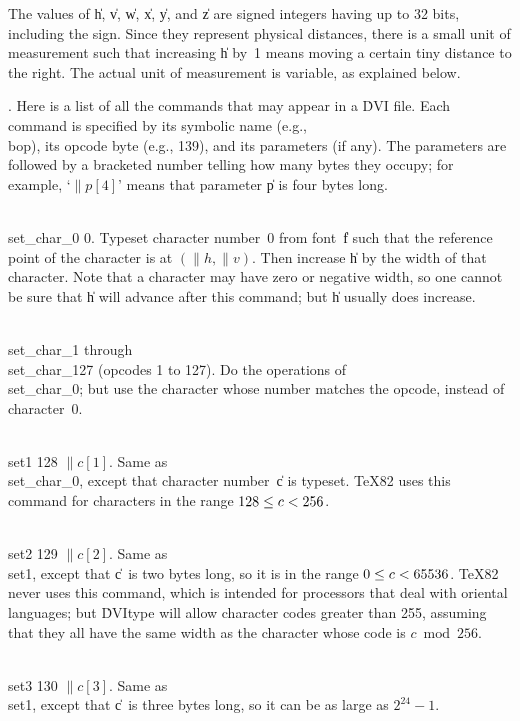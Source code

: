 The values of \|h, \|v, \|w, \|x, \|y, and \|z are signed integers having up
to 32 bits, including the sign. Since they represent physical distances,
there is a small unit of measurement such that increasing \|h by~1 means
moving a certain tiny distance to the right. The actual unit of
measurement is variable, as explained below.

\fi

. Here is a list of all the commands that may appear in a \.{DVI} file.
Each
command is specified by its symbolic name (e.g., \\{bop}), its opcode byte
(e.g., 139), and its parameters (if any). The parameters are followed
by a bracketed number telling how many bytes they occupy; for example,
`$\|p[4]$' means that parameter \|p is four bytes long.

\yskip\hang\\{set\_char\_0} 0. Typeset character number~0 from font~\|f
such that the reference point of the character is at $(\|h,\|v)$. Then
increase \|h by the width of that character. Note that a character may
have zero or negative width, so one cannot be sure that \|h will advance
after this command; but \|h usually does increase.

\yskip\hang\\{set\_char\_1} through \\{set\_char\_127} (opcodes 1 to 127).
Do the operations of \\{set\_char\_0}; but use the character whose number
matches the opcode, instead of character~0.

\yskip\hang\\{set1} 128 $\|c[1]$. Same as \\{set\_char\_0}, except that
character
number~\|c is typeset. \TeX82 uses this command for characters in the
range $128\le\hbox{$c$}<256$.

\yskip\hang\\{set2} 129 $\|c[2]$. Same as \\{set1}, except that \|c~is two
bytes long, so it is in the range $0\le\hbox{$c$}<65536$. \TeX82 never uses this
command, which is intended for processors that deal with oriental languages;
but \.{DVItype} will allow character codes greater than 255, assuming that
they all have the same width as the character whose code is $c \bmod 256$.

\yskip\hang\\{set3} 130 $\|c[3]$. Same as \\{set1}, except that \|c~is three
bytes long, so it can be as large as $2^{24}-1$.

